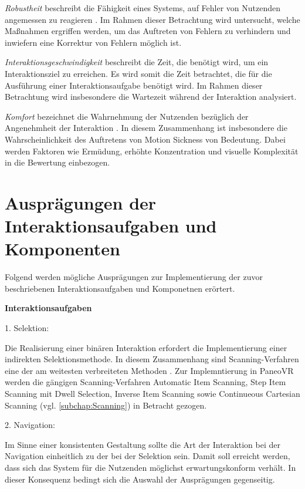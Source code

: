\textit{Robustheit} beschreibt die Fähigkeit eines Systems, auf Fehler von Nutzenden angemessen zu reagieren \citep{DINISO9241-110}. Im Rahmen dieser Betrachtung wird untersucht, welche Maßnahmen ergriffen werden, um das Auftreten von Fehlern zu verhindern und inwiefern eine Korrektur von Fehlern möglich ist.

\textit{Interaktionsgeschwindigkeit} beschreibt die Zeit, die benötigt wird, um ein Interaktionsziel zu erreichen. Es wird somit die Zeit betrachtet, die für die Ausführung einer Interaktionsaufgabe benötigt wird. Im Rahmen dieser Betrachtung wird insbesondere die Wartezeit während der Interaktion analysiert.  

\textit{Komfort} bezeichnet die Wahrnehmung der Nutzenden bezüglich der Angenehmheit der Interaktion \citep{jerald_vr_2016}. In diesem Zusammenhang ist insbesondere die Wahrscheinlichkeit des Auftretens von Motion Sickness von Bedeutung. Dabei werden Faktoren wie Ermüdung, erhöhte Konzentration und visuelle Komplexität in die Bewertung einbezogen.

\section{Ausprägungen der Interaktionsaufgaben und Komponenten}

Folgend werden mögliche Ausprägungen zur Implementierung der zuvor beschriebenen Interaktionsaufgaben und Komponetnen erörtert.

{\normalfont \bfseries Interaktionsaufgaben}  

1. Selektion: 

Die Realisierung einer binären Interaktion erfordert die Implementierung einer indirekten Selektionsmethode. In diesem Zusammenhang sind Scanning-Verfahren eine der am weitesten verbreiteten Methoden \citep{COOK2015117}. Zur Implemntierung in PaneoVR werden die gängigen Scanning-Verfahren Automatic Item Scanning, Step Item Scanning mit Dwell Selection, Inverse Item Scanning sowie Continueous Cartesian Scanning (vgl. \autoref{subchap:Scanning}) in Betracht gezogen. 

2. Navigation:

Im Sinne einer konsistenten Gestaltung sollte die Art der Interaktion bei der Navigation einheitlich zu der bei der Selektion sein. Damit soll erreicht werden, dass sich das System für die Nutzenden möglichst erwartungskonform verhält. In dieser Konsequenz bedingt sich die Auswahl der Ausprägungen gegenseitig.


